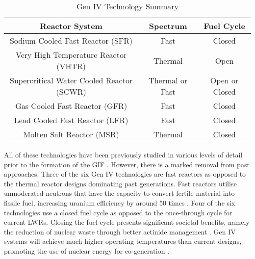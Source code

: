 \documentclass[journal]{IEEEtran}
\begin{document}
\begin{table}[!t]
\renewcommand{\arraystretch}{1.1}
\caption{Gen IV Technology Summary \cite{GenIVRoadmap}}
\label{table:GenIV}
\centering
\begin{tabular}{|c|c|c|}
\hline
\textbf{Reactor System} & \textbf{Spectrum} & \textbf{Fuel Cycle}\\
\hline
Sodium Cooled Fast Reactor (SFR) & Fast & Closed \\
\hline
Very High Temperature Reactor (VHTR) & Thermal & Open \\
\hline
Supercritical Water Cooled Reactor (SCWR) & Thermal or Fast & Open or Closed \\
\hline
Gas Cooled Fast Reactor (GFR) & Fast & Closed \\
\hline
Lead Cooled Fast Reactor (LFR) & Fast & Closed \\
\hline
Molten Salt Reactor (MSR) & Thermal & Closed \\
\hline

\end{tabular}
\end{table}

All of these technologies have been previously studied in various levels of detail prior to the formation of the GIF \cite{Marques2010a}. However, there is a marked removal from past approaches. 
Three of the six Gen IV technologies are fast reactors as opposed to the thermal reactor designs dominating past generations.
Fast reactors utilise unmoderated neutrons that have the capacity to convert fertile material into fissile fuel, increasing uranium efficiency by around 50 times \cite{Locatelli2013}. 
Four of the six technologies use a closed fuel cycle as opposed to the once-through cycle for current LWRs. 
Closing the fuel cycle presents significant societal benefits, namely the reduction of nuclear waste through better actinide management \cite{GenIVRoadmap, Bhatnagar2011}. 
Gen IV systems will achieve much  higher operating temperatures than current designs, promoting the use of nuclear energy for co-generation \cite{ Bhatnagar2011}. 
\end{document}
